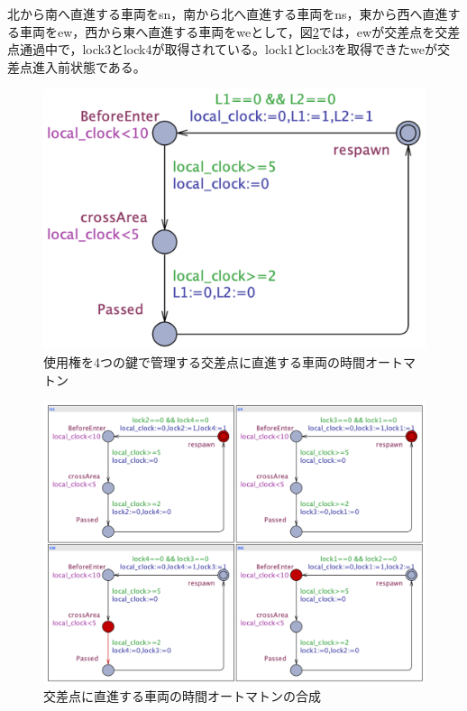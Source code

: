 \documentclass{tpu-sotu}
\begin{document}
	北から南へ直進する車両をsn，南から北へ直進する車両をns，東から西へ直進する車両をew，西から東へ直進する車両をweとして，図\ref{newsS}では，ewが交差点を交差点通過中で，lock3とlock4が取得されている。lock1とlock3を取得できたweが交差点進入前状態である。
	\begin{figure}[htbp]
	\centering
	\includegraphics[width=130mm]{news.png}
	\caption{使用権を4つの鍵で管理する交差点に直進する車両の時間オートマトン}
	\label{news}
	\end{figure}
	\begin{figure}[htbp]
	\centering
	\includegraphics[width=130mm]{newsSimu.png}
	\caption{交差点に直進する車両の時間オートマトンの合成}
	\label{newsS}
	\end{figure}
	
	
\end{document}
